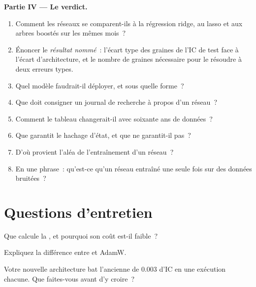 \begin{problem}
\medskip\noindent\textbf{Partie IV --- Le verdict.}
\begin{enumerate}[resume]
\item Comment les réseaux se comparent-ils à la régression ridge, au lasso et aux arbres boostés sur les mêmes mois~?
\item Énoncer le \emph{résultat nommé}~: l'écart type des graines de l'IC de test face à l'écart d'architecture, et le
nombre de graines nécessaire pour le résoudre à deux erreurs types.
\item Quel modèle faudrait-il déployer, et sous quelle forme~?
\item Que doit consigner un journal de recherche à propos d'un réseau~?
\item Comment le tableau changerait-il avec soixante ans de données~?
\item Que garantit le hachage d'état, et que ne garantit-il pas~?
\item D'où provient l'aléa de l'entraînement d'un réseau~?
\item En une phrase~: qu'est-ce qu'un réseau entraîné une seule fois sur des données bruitées~?
\end{enumerate}
\end{problem}

\section{Questions d'entretien}

\begin{interviewq}\label{iq:ml:neural-networks-for-noisy-tabular-data:1}
Que calcule la , et pourquoi son coût est-il faible~?
\end{interviewq}

\begin{interviewq}\label{iq:ml:neural-networks-for-noisy-tabular-data:2}
Expliquez la différence entre  et AdamW.
\end{interviewq}

\begin{interviewq}\label{iq:ml:neural-networks-for-noisy-tabular-data:3}
Votre nouvelle architecture bat l'ancienne de 0.003 d'IC en une exécution chacune. Que faites-vous avant d'y croire~?
\end{interviewq}

